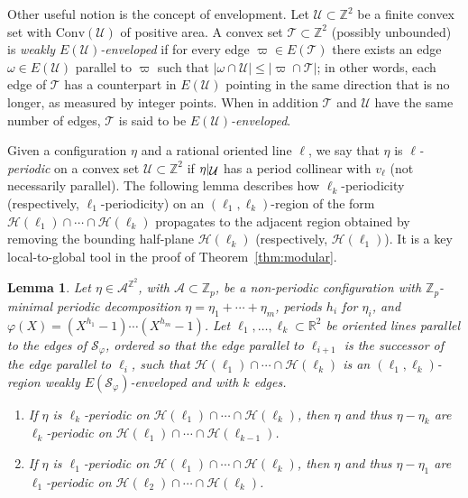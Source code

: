 \documentclass[12pt]{amsart}
\numberwithin{equation}{section}
\newtheorem{lemma}[theorem]{Lemma}
\newcommand{\bb}[1]{\mathbb{#1}}
\newcommand{\sob}[1]{\ensuremath{{\mathbin |}\raise-.4ex\hbox{$#1$}}}
\begin{document}
Other useful notion is the concept of envelopment. Let $ \mathcal U \subset \mathbb Z^2$ be a finite convex set with $ \mathrm{Conv}(\mathcal U) $ of positive area. A convex set $ \mathcal T \subset \mathbb Z^2$ (possibly unbounded) is \emph{weakly $E(\mathcal U)$-enveloped} if for every edge $ \varpi \in E(\mathcal T) $ there exists an edge $ \omega \in E(\mathcal U) $ parallel to $ \varpi $ such that $ |\omega \cap \mathcal{U}| \le |\varpi \cap \mathcal T|$; in other words, each edge of $\mathcal T$ has a counterpart in $ E(\mathcal U)$ pointing in the same direction that is no longer, as measured by integer points. When in addition $\mathcal T $ and $ \mathcal U $ have the same number of edges, $ \mathcal T$ is said to be \emph{$E(\mathcal{U})$-enveloped}. 

Given a configuration $\eta$ and a rational oriented line $\pmb{\ell}$, we say that $ \eta $ is \emph{$\ell$-periodic} on a convex set $ \mathcal U \subset \bb{Z}^2 $ if $ \eta \sob{\mathcal U} $ has a period collinear with $v_{\pmb{\ell}}$ (not necessarily parallel). The following lemma describes how $\ell_k$-periodicity (respectively, $\ell_1$-periodicity) on an $(\pmb{\ell}_1, \pmb{\ell}_k)$-region of the form $\mathcal{H}(\pmb{\ell}_1) \cap \cdots \cap \mathcal{H}(\pmb{\ell}_k)$ propagates to the adjacent region obtained by removing the bounding half-plane $\mathcal H(\pmb{\ell}_k)$ (respectively, $\mathcal H(\pmb{\ell}_1)$). It is a key local-to-global tool in the proof of Theorem~\ref{thm:modular}. 

\begin{lemma}\label{lem_ext_periodicity_(l,l')-region}
Let $\eta \in \mathcal{A}^{\bb{Z}^2}$, with \(\mathcal{A} \subset \bb{Z}_p\), be a non-periodic configuration with $\bb{Z}_p$-mi\-ni\-mal periodic decomposition $\eta = \eta_1+\cdots+\eta_m$, periods $ h_i $ for $ \eta_i $, and $\varphi(X) = (X^{h_1}-1) \cdots (X^{h_m}-1)$. Let $\pmb{\ell}_1, \ldots, \pmb{\ell}_k \subset \bb{R}^2$ be oriented lines parallel to the edges of $\mathcal{S}_{\varphi}$, ordered so that the edge parallel to $\pmb{\ell}_{i+1}$ is the successor of the edge parallel to $\pmb{\ell}_{i}$, such that $\mathcal{H}(\pmb{\ell}_1) \cap \cdots \cap \mathcal{H}(\pmb{\ell}_k)$ is an $(\pmb{\ell}_1,\pmb{\ell}_k)$-region weakly $E(\mathcal{S}_{\varphi})$-enveloped and with $k$ edges.
\begin{enumerate}[label=(\roman*)]\setlength{\itemsep}{5pt}
	\item If $\eta$ is $\ell_k$-pe\-ri\-o\-dic on $\mathcal{H}(\pmb{\ell}_1) \cap \cdots \cap \mathcal{H}(\pmb{\ell}_k)$, then $\eta$ and thus $\eta-\eta_k$ are $\ell_k$-pe\-ri\-o\-dic on $\mathcal{H}(\pmb{\ell}_1) \cap \cdots \cap \mathcal{H}(\pmb{\ell}_{k-1})$. 
	
	\item If $\eta$ is $\ell_1$-pe\-ri\-o\-dic on $\mathcal{H}(\pmb{\ell}_1) \cap \cdots \cap \mathcal{H}(\pmb{\ell}_k)$, then $\eta$ and thus $\eta-\eta_1$ are $\ell_1$-pe\-ri\-o\-dic on $\mathcal{H}(\pmb{\ell}_2) \cap \cdots \cap \mathcal{H}(\pmb{\ell}_{k})$.
\end{enumerate}
\end{lemma}
\end{document}
